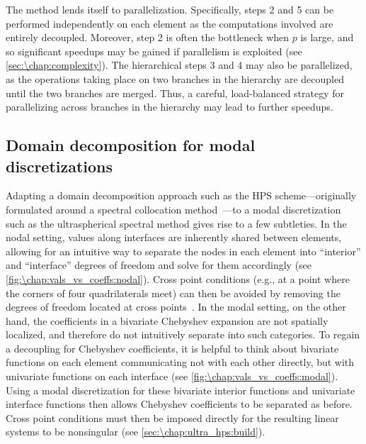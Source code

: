 The method lends itself to parallelization. Specifically, steps 2 and 5 can be performed independently on each element as the computations involved are entirely decoupled. Moreover, step 2 is often the bottleneck when $p$ is large, and so significant speedups may be gained if parallelism is exploited (see \cref{sec:\chap:complexity}). The hierarchical steps 3 and 4 may also be parallelized, as the operations taking place on two branches in the hierarchy are decoupled until the two branches are merged. Thus, a careful, load-balanced strategy for parallelizing across branches in the hierarchy may lead to further speedups.

\subsection{Domain decomposition for modal discretizations}\label{sec:\chap:modal_dd}
Adapting a domain decomposition approach such as the HPS scheme---originally formulated around a spectral collocation method~\cite{Martinsson_09_01, Martinsson_13_01}---to a modal discretization such as the ultraspherical spectral method gives rise to a few subtleties. In the nodal setting, values along interfaces are inherently shared between elements, allowing for an intuitive way to separate the nodes in each element into ``interior'' and ``interface'' degrees of freedom and solve for them accordingly (see \cref{fig:\chap:vals_vs_coeffs:nodal}). Cross point conditions (e.g., at a point where the corners of four quadrilaterals meet) can then be avoided by removing the degrees of freedom located at cross points~\cite{Babb_20_01}. In the modal setting, on the other hand, the coefficients in a bivariate Chebyshev expansion are not spatially localized, and therefore do not intuitively separate into such categories. To regain a decoupling for Chebyshev coefficients, it is helpful to think about bivariate functions on each element communicating not with each other directly, but with univariate functions on each interface (see \cref{fig:\chap:vals_vs_coeffs:modal}). Using a modal discretization for these bivariate interior functions and univariate interface functions then allows Chebyshev coefficients to be separated as before. Cross point conditions must then be imposed directly for the resulting linear systems to be nonsingular (see \cref{sec:\chap:ultra_hps:build}).

